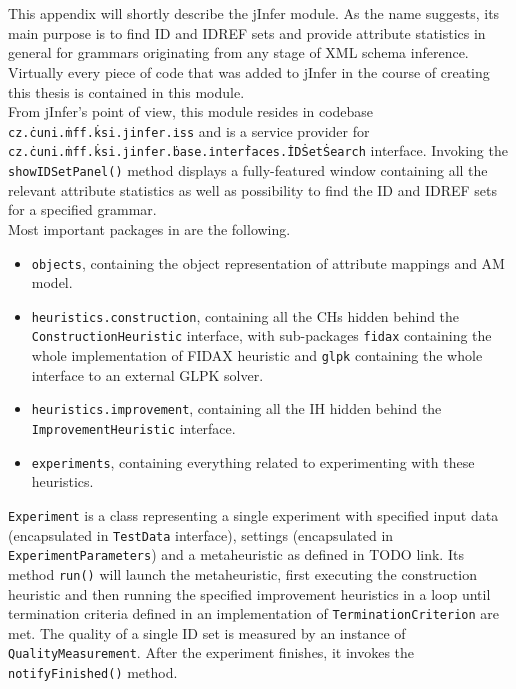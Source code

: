 \chapter{}
\label{appendix-iss}

This appendix will shortly describe the  jInfer module. As the name suggests, its main purpose is to find ID and IDREF sets and provide attribute statistics in general for grammars originating from any stage of XML schema inference. Virtually every piece of code that was added to jInfer in the course of creating this thesis is contained in this module.\\

From jInfer's point of view, this module resides in codebase \texttt{cz.\.cuni.\.mff.\.ksi.\.jinfer.\.iss} and is a service provider for \texttt{cz.\.cuni.\.mff.\.ksi.\.jinfer.\.base.\.inter\.faces.\.ID\.Set\.Search} interface. Invoking the \texttt{showIDSetPanel()} method displays a fully-featured window containing all the relevant attribute statistics as well as possibility to find the ID and IDREF sets for a specified grammar.\\

Most important packages in  are the following.

\begin{itemize}
	\item \texttt{objects}, containing the object representation of attribute mappings and AM model.
	\item \texttt{heuristics.construction}, containing all the CHs hidden behind the \texttt{Con\-struc\-tion\-Heu\-ris\-tic} interface, with sub-packages \texttt{fidax} containing the whole implementation of FIDAX heuristic %
	and \texttt{glpk} containing the whole interface to an external GLPK solver. %
	\item \texttt{heuristics.improvement}, containing all the IH hidden behind the \texttt{Im\-prove\-ment\-Heu\-ris\-tic} interface.
	\item \texttt{experiments}, containing everything related to experimenting with these heuristics.
\end{itemize}

\texttt{Experiment} is a class representing a single experiment with specified input data (encapsulated in \texttt{Test\-Data} interface), settings (encapsulated in \texttt{Ex\-pe\-ri\-ment\-Pa\-ra\-me\-ters}) and a metaheuristic as defined in TODO link. Its method \texttt{run()} will launch the metaheuristic, first executing the construction heuristic and then running the specified improvement heuristics in a loop until termination criteria defined in an implementation of \texttt{Ter\-mi\-na\-tion\-Cri\-ter\-ion} are met. The quality of a single ID set is measured by an instance of \texttt{Quality\-Measurement}. After the experiment finishes, it invokes the \texttt{notify\-Finished()} method.\\

